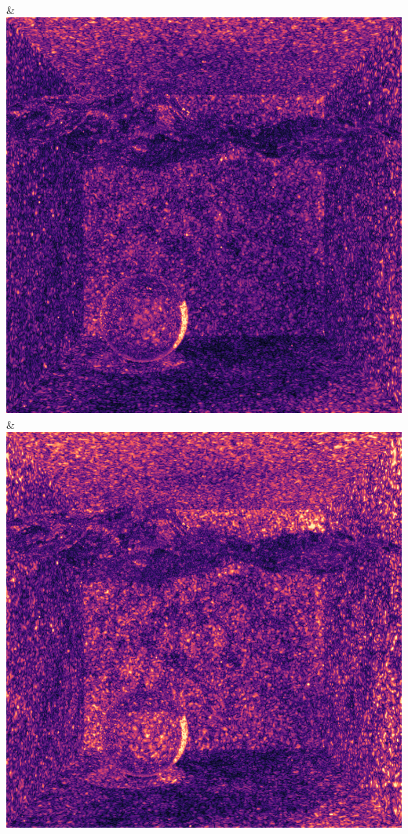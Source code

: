 \\
& \includegraphics[width=\linewidth]{figures/py/tests/photon_optimization/SER_1spp_flip.png}
& \includegraphics[width=\linewidth]{figures/py/tests/photon_optimization/SER+Reject70_1spp_flip.png}
